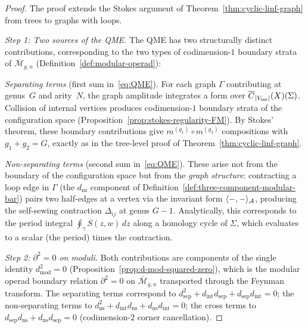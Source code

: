 \begin{proof}
The proof extends the Stokes argument of
Theorem~\ref{thm:cyclic-linf-graph} from trees to graphs with loops.

\emph{Step 1: Two sources of the QME.}
The QME has two structurally distinct contributions,
corresponding to the two types of codimension-$1$ boundary
strata of $\overline{\mathcal{M}}_{g,n}$
(Definition~\ref{def:modular-operad}):

\emph{Separating terms} (first sum in~\eqref{eq:QME}).
For each graph $\Gamma$ contributing at genus~$G$ and arity~$N$,
the graph amplitude integrates a form over
$\overline{C}_{|V_{\mathrm{int}}|}(X)(\Sigma)$.
Collision of internal vertices produces codimension-$1$ boundary
strata of the configuration space
(Proposition~\ref{prop:stokes-regularity-FM}).
By Stokes' theorem, these boundary contributions give
$m^{(g_1)} \circ m^{(g_2)}$ compositions with $g_1 + g_2 = G$,
exactly as in the tree-level proof of
Theorem~\ref{thm:cyclic-linf-graph}.

\emph{Non-separating terms} (second sum in~\eqref{eq:QME}).
These arise not from the boundary of the configuration space but
from the \emph{graph structure}: contracting a loop edge in
$\Gamma$ (the $d_{\mathrm{ns}}$ component of
Definition~\ref{def:three-component-modular-bar})
pairs two half-edges at a vertex via the invariant form
$\langle -, - \rangle_{\mathcal{A}}$, producing the self-sewing contraction
$\Delta_{ij}$ at genus $G - 1$.
Analytically, this corresponds to the period integral
$\oint_\gamma S(z, w)\, dz$ along a homology cycle of $\Sigma$,
which evaluates to a scalar (the period) times the contraction.

\emph{Step 2: $\partial^2 = 0$ on moduli.}
Both contributions are components of the single identity
$d_{\mathrm{mod}}^2 = 0$
(Proposition~\ref{prop:d-mod-squared-zero}),
which is the modular operad boundary relation
$\partial^2 = 0$ on $\overline{\mathcal{M}}_{g,n}$
transported through the Feynman transform.
The separating terms correspond to
$d_{\mathrm{sep}}^2 + d_{\mathrm{int}} d_{\mathrm{sep}}
+ d_{\mathrm{sep}} d_{\mathrm{int}} = 0$;
the non-separating terms to
$d_{\mathrm{ns}}^2 + d_{\mathrm{int}} d_{\mathrm{ns}}
+ d_{\mathrm{ns}} d_{\mathrm{int}} = 0$;
the cross terms to
$d_{\mathrm{sep}} d_{\mathrm{ns}}
+ d_{\mathrm{ns}} d_{\mathrm{sep}} = 0$
(codimension-$2$ corner cancellation).
\end{proof}

